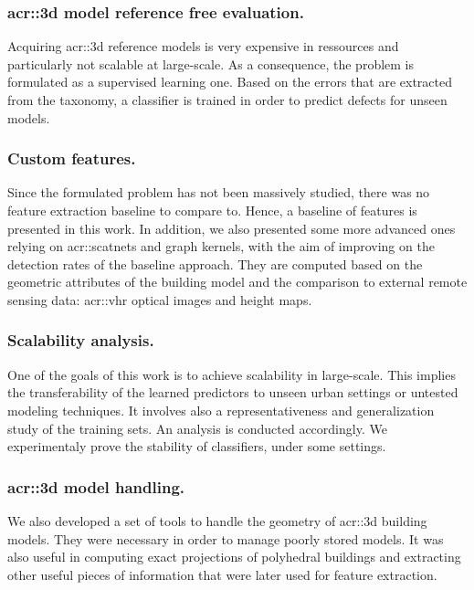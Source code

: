        \subsubsection{\texorpdfstring{\gls*{acr::3d}}{3D} model reference free evaluation.}
            Acquiring \gls{acr::3d} reference models is very expensive in ressources and particularly not scalable at large-scale.
            As a consequence, the problem is formulated as a supervised learning one.
            Based on the errors that are extracted from the taxonomy, a classifier is trained in order to predict defects for unseen models.

        \subsubsection{Custom features.}
            Since the formulated problem has not been massively studied, there was no feature extraction baseline to compare to.
            Hence, a baseline of features is presented in this work.
            In addition, we also presented some more advanced ones relying on \glspl{acr::scatnet} and graph kernels, with the aim of improving on the detection rates of the baseline approach.
            They are computed based on the geometric attributes of the building model and the comparison to external remote sensing data: \gls{acr::vhr} optical images and height maps.
        
        \subsubsection{Scalability analysis.}
            One of the goals of this work is to achieve scalability in large-scale.
            This implies the transferability of the learned predictors to unseen urban settings or untested modeling techniques.
            It involves also a representativeness and generalization study of the training sets.
            An analysis is conducted accordingly.
            We experimentaly prove the stability of classifiers, under some settings.
        
        \subsubsection{\texorpdfstring{\gls*{acr::3d}}{3D} model handling.}
            We also developed a set of tools to handle the geometry of \gls{acr::3d} building models.
            They were necessary in order to manage poorly stored models.
            It was also useful in computing exact projections of polyhedral buildings and extracting other useful pieces of information that were later used for feature extraction.

